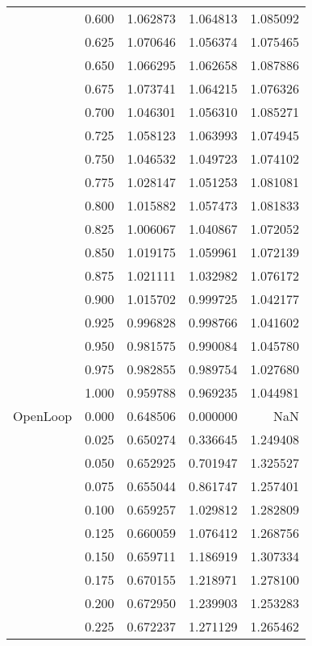 \begin{tabular}{llrrr}
         & 0.600 &   1.062873 &   1.064813 &   1.085092 \\
         & 0.625 &   1.070646 &   1.056374 &   1.075465 \\
         & 0.650 &   1.066295 &   1.062658 &   1.087886 \\
         & 0.675 &   1.073741 &   1.064215 &   1.076326 \\
         & 0.700 &   1.046301 &   1.056310 &   1.085271 \\
         & 0.725 &   1.058123 &   1.063993 &   1.074945 \\
         & 0.750 &   1.046532 &   1.049723 &   1.074102 \\
         & 0.775 &   1.028147 &   1.051253 &   1.081081 \\
         & 0.800 &   1.015882 &   1.057473 &   1.081833 \\
         & 0.825 &   1.006067 &   1.040867 &   1.072052 \\
         & 0.850 &   1.019175 &   1.059961 &   1.072139 \\
         & 0.875 &   1.021111 &   1.032982 &   1.076172 \\
         & 0.900 &   1.015702 &   0.999725 &   1.042177 \\
         & 0.925 &   0.996828 &   0.998766 &   1.041602 \\
         & 0.950 &   0.981575 &   0.990084 &   1.045780 \\
         & 0.975 &   0.982855 &   0.989754 &   1.027680 \\
         & 1.000 &   0.959788 &   0.969235 &   1.044981 \\
OpenLoop & 0.000 &   0.648506 &   0.000000 &        NaN \\
         & 0.025 &   0.650274 &   0.336645 &   1.249408 \\
         & 0.050 &   0.652925 &   0.701947 &   1.325527 \\
         & 0.075 &   0.655044 &   0.861747 &   1.257401 \\
         & 0.100 &   0.659257 &   1.029812 &   1.282809 \\
         & 0.125 &   0.660059 &   1.076412 &   1.268756 \\
         & 0.150 &   0.659711 &   1.186919 &   1.307334 \\
         & 0.175 &   0.670155 &   1.218971 &   1.278100 \\
         & 0.200 &   0.672950 &   1.239903 &   1.253283 \\
         & 0.225 &   0.672237 &   1.271129 &   1.265462 \\

\end{tabular}
